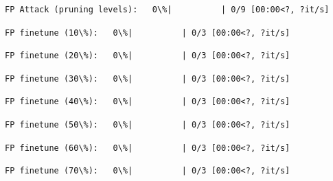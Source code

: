 \documentclass[11pt]{article}
\begin{document}
    
    \begin{Verbatim}[commandchars=\\\{\}]
FP Attack (pruning levels):   0\%|          | 0/9 [00:00<?, ?it/s]
    \end{Verbatim}

    
    
    \begin{Verbatim}[commandchars=\\\{\}]
FP finetune (10\%):   0\%|          | 0/3 [00:00<?, ?it/s]
    \end{Verbatim}

    
    
    \begin{Verbatim}[commandchars=\\\{\}]
FP finetune (20\%):   0\%|          | 0/3 [00:00<?, ?it/s]
    \end{Verbatim}

    
    
    \begin{Verbatim}[commandchars=\\\{\}]
FP finetune (30\%):   0\%|          | 0/3 [00:00<?, ?it/s]
    \end{Verbatim}

    
    
    \begin{Verbatim}[commandchars=\\\{\}]
FP finetune (40\%):   0\%|          | 0/3 [00:00<?, ?it/s]
    \end{Verbatim}

    
    
    \begin{Verbatim}[commandchars=\\\{\}]
FP finetune (50\%):   0\%|          | 0/3 [00:00<?, ?it/s]
    \end{Verbatim}

    
    
    \begin{Verbatim}[commandchars=\\\{\}]
FP finetune (60\%):   0\%|          | 0/3 [00:00<?, ?it/s]
    \end{Verbatim}

    
    
    \begin{Verbatim}[commandchars=\\\{\}]
FP finetune (70\%):   0\%|          | 0/3 [00:00<?, ?it/s]
    \end{Verbatim}
\end{document}
